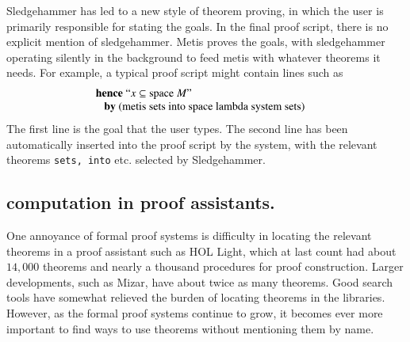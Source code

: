 \documentclass{llncs}
\begin{document}

Sledgehammer has led to a new style of theorem proving, in which the
user is primarily responsible for stating the goals.  In the final
proof script, there is no explicit mention of sledgehammer.  Metis
proves the goals, with sledgehammer operating silently in the
background to feed metis with whatever theorems it needs.
For example, a typical proof script might contain  lines such as \cite{Paar}
\[
\begin{array}{ll}
\text{{\bf hence} ``$x \subseteq \text{space}~M$''}\\
\text{~~~{\bf by} (metis sets into space lambda system sets)}&
\end{array}
\]
The first line is the goal that the user types. The second line has been
automatically inserted into the proof script by the system, with the relevant
theorems {\tt sets, into} etc. selected by Sledgehammer.






\subsection{computation in proof assistants.}

One annoyance of formal proof systems is difficulty in locating the relevant theorems
in a proof assistant such as HOL Light, which at last count had about $14,000$
theorems and nearly a thousand procedures for proof construction.
Larger developments, such as Mizar, have about twice as many theorems.
Good search tools have somewhat relieved the burden of locating theorems
in the libraries.  However, as the formal proof
systems continue to grow, it becomes ever more important to find ways to
use theorems without mentioning them by name.


\end{document}
